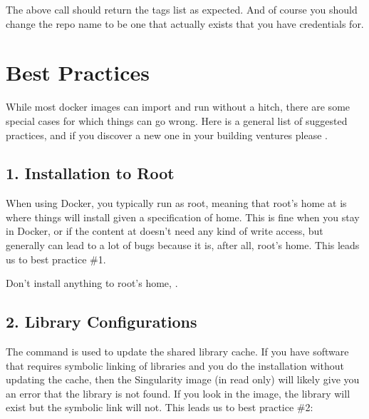 \documentclass[letterpaper,10pt,english]{sphinxmanual}
\begin{document}
%
\begin{sphinxVerbatim}[commandchars=\\\{\}]
  
\end{sphinxVerbatim}

The above call should return the tags list as expected. And of course
you should change the repo name to be one that actually exists that you
have credentials for.


\section{Best Practices}
\label{\detokenize{singularity_and_docker:best-practices}}
While most docker images can import and run without a hitch, there are
some special cases for which things can go wrong. Here is a general list
of suggested practices, and if you discover a new one in your building
ventures please .


\subsection{1. Installation to Root}
\label{\detokenize{singularity_and_docker:installation-to-root}}
When using Docker, you typically run as root, meaning that root’s home
at  is where things will install given a specification of home. This is
fine when you stay in Docker, or if the content at  doesn’t need any
kind of write access, but generally can lead to a lot of bugs because
it is, after all, root’s home. This leads us to best practice \#1.

Don’t install anything to root’s home, .


\subsection{2. Library Configurations}
\label{\detokenize{singularity_and_docker:library-configurations}}
The command  is used to update the shared library cache. If
you have software that requires symbolic linking of libraries and you
do the installation without updating the cache, then the Singularity
image (in read only) will likely give you an error that the library is
not found. If you look in the image, the library will exist but the
symbolic link will not. This leads us to best practice \#2:
\end{document}
